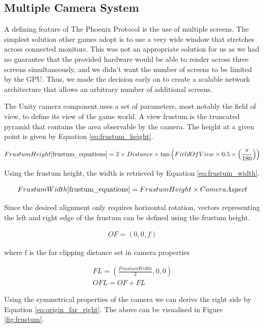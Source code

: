 \documentclass[a4paper,11pt]{article}
\begin{document}
\subsection{Multiple Camera System}
A defining feature of The Phoenix Protocol is the use of multiple screens. The simplest solution other games adopt is to use a very wide window that stretches across connected monitors. This was not an appropriate solution for us as we had no guarantee that the provided hardware would be able to render across three screens simultaneously, and we didn't want the number of screens to be limited by the GPU. Thus, we made the decision early on to create a scalable network architecture that allows an arbitrary number of additional screens. 

The Unity camera component\cite{unity_camera} uses a set of parameters, most notably the field of view, to define its view of the game world. A view frustum \cite{unity_frustum} is the truncated pyramid that contains the area observable by the camera. The height at a given point is given by Equation \ref{eq:frustum_height}.

\begin{align}
	Frustum Height\cite{frustum_equations} = 2 \times Distance \times \tan \left( Field Of View \times 0.5 \times \left( \frac{\pi}{180} \right)\right) \label{eq:frustum_height}
\end{align}

Using the frustum height, the width is retrieved by Equation \ref{eq:frustum_width}.

\begin{align}
	Frustum Width\cite{frustum_equations} = Frustum Height \times Camera Aspect \label{eq:frustum_width}
\end{align}

Since the desired alignment only requires horizontal rotation, vectors representing the left and right edge of the frustum can be defined using the frustum height.

\begin{align*}
	OF = (0, 0, f)
\end{align*}

where f is the far clipping distance set in camera properties

\begin{gather*}
	FL  = \left( \frac{Frustum Width}{2}, 0, 0 \right) \\
	OFL = OF + FL
\end{gather*}

Using the symmetrical properties of the camera we can derive the right side by Equation \ref{eq:origin_far_right}. The above can be visualised in Figure \ref{fig:frustum}.
\end{document}
